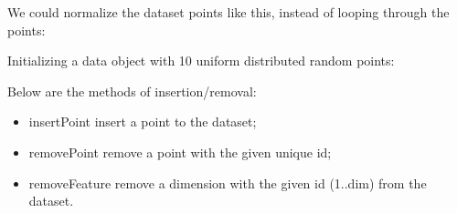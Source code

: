 \documentclass[letterpaper,10pt,english]{sphinxmanual}
\begin{document}
\sphinxAtStartPar
We could normalize the dataset points like this, instead of looping through the points:

\begin{sphinxVerbatim}[commandchars=\\\{\}]
 

   \PYG{p}{[}\PYG{p}{]} 
       

\end{sphinxVerbatim}

\sphinxAtStartPar
Initializing a data object with 10 uniform distributed random points:

\begin{sphinxVerbatim}[commandchars=\\\{\}]
 
       
         

\end{sphinxVerbatim}

\sphinxAtStartPar
Below are the methods of insertion/removal:
\begin{itemize}
\item {} 
\sphinxAtStartPar
insertPoint \sphinxhyphen{} insert a point to the dataset;

\item {} 
\sphinxAtStartPar
removePoint \sphinxhyphen{} remove a point with the given unique id;

\item {} 
\sphinxAtStartPar
removeFeature \sphinxhyphen{} remove a dimension with the given id (1..dim) from the dataset.

\end{itemize}
\end{document}
